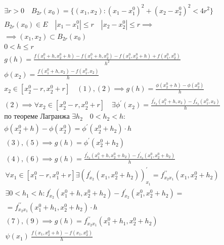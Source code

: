 \documentclass[main]{subfiles}
\begin{document}
        \begin{longProof}
            \begin{gather*}
                \exists r > 0 \quad B_{2r}(x_0) = \{ (x_1,x_2) : (x_1-x_1^0)^2 + (x_2-x_2^0)^2 < 4r^2 \} \\
                B_{2r}(x_0) \in E \quad |x_1 - x_1^0| \leq r \quad |x_2-x_2^0| \leq r \implies \\
                \implies (x_1,x_2) \subset B_{2r}(x_0) \\
                0 < h \leq r \\
                g(h) = \frac{f(x_1^0+h,x_2^0+h)-f(x_1^0+h,x_2^0) - f(x_1^0,x_2^0+h) + f(x_1^0,x_2^0)}{h^2} \tag{1}\\
                \phi(x_2) = \frac{f(x_1^0+h,x_2) - f(x_1^0,x_2)}{h} \tag{2}\\
                x_2 \in [x_2^0-r, x_2^0+r]  \quad (1),(2) \implies g(h) = \frac{\phi(x_2^0+h)-\phi(x_2^0)}{h} \tag{3} \\
                (2) \implies \forall x_2 \in [x^0_2 - r, x^0_2 + r] \quad \exists \phi^\prime(x_2) = \frac{f^\prime_{x_2}(x_1^0+h,x_2)-f^\prime_{x_2}(x_1^0,x_2)}{h} \tag{4}\\
                \text{по теореме Лагранжа } \exists h_2 \quad 0 < h_2 < h : \\
                \phi(x_2^0+h) - \phi(x_2^0) = \phi^\prime(x_2^0+h_2) \cdot h \tag{5}
            \end{gather*}
            \begin{gather*}
                (3),(5) \implies g(h) = \phi^\prime(x_2^0 + h_2) \tag{6}\\
                (4),(6) \implies g(h) = \frac{f^\prime_{x_2}(x_1^0+h,x_2^0+h_2)-f^\prime_{x_2}(x_1^0,x^0_2 + h_2)}{h} \tag{7}\\
                \forall x_1 \in [x_1^0-r,x_1^0+r] \exists (f^\prime_{x_2}(x_1,x_2^0+h_2))^\prime_{x_1} = f^{\prime\prime}_{x_2x_1}(x_1,x_2^0+h_2) \tag{8}\\
                \exists 0 < h_1 < h : f^\prime_{x_2}(x_1^0+h,x_2^0+h_2) - f^\prime_{x_2}(x_1^0,x_2^0+h_2) =\\=
                f^{\prime\prime}_{x_2x_1}(x_1^0 + h_1, x_2^0 + h_2) \cdot h \tag{9}\\
                (7),(9) \implies g(h) = f^{\prime\prime}_{x_2x_1}(x_1^0+h_1,x_2^0 + h_2) \tag{10}\\
                \psi(x_1) \ \frac{f(x_1,x_2^0+h)-f(x_1,x_2^0)}{h} \tag{11}
            \end{gather*}

\end{longProof}
\end{document}
